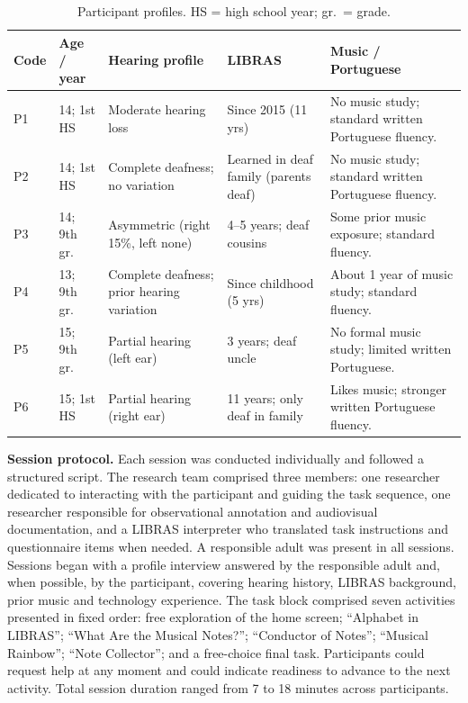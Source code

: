 \documentclass{llncs}
\begin{document}
\begin{table}[t]
  \caption{Participant profiles. HS = high school year; gr.\ = grade.}
  \label{tab:participants}
  \centering
  \footnotesize
  \setlength{\tabcolsep}{2.5pt}
  \renewcommand{\arraystretch}{1.12}
  \begin{tabular*}{\textwidth}{@{\extracolsep{\fill}}p{} p{} p{} p{} p{}@{}}
    \toprule
    \textbf{Code} & \textbf{Age / year} & \textbf{Hearing profile} &
      \textbf{LIBRAS} & \textbf{Music / Portuguese} \\
    \midrule
    P1 & 14; 1st HS & Moderate hearing loss &
      Since 2015 (11 yrs) &
      No music study; standard written Portuguese fluency. \\
    P2 & 14; 1st HS & Complete deafness; no variation &
      Learned in deaf family (parents deaf) &
      No music study; standard written Portuguese fluency. \\
    P3 & 14; 9th gr. & Asymmetric (right 15\%, left none) &
      4--5 years; deaf cousins &
      Some prior music exposure; standard fluency. \\
    P4 & 13; 9th gr. & Complete deafness; prior hearing variation &
      Since childhood (5 yrs) &
      About 1 year of music study; standard fluency. \\
    P5 & 15; 9th gr. & Partial hearing (left ear) &
      3 years; deaf uncle &
      No formal music study; limited written Portuguese. \\
    P6 & 15; 1st HS & Partial hearing (right ear) &
      11 years; only deaf in family &
      Likes music; stronger written Portuguese fluency. \\
    \bottomrule
  \end{tabular*}
\end{table}

\textbf{Session protocol.} Each session was conducted individually and followed a
structured script. The research team comprised three members: one researcher dedicated
to interacting with the participant and guiding the task sequence, one researcher
responsible for observational annotation and audiovisual documentation, and a LIBRAS
interpreter who translated task instructions and questionnaire items when needed. A
responsible adult was present in all sessions. Sessions began with a profile interview
answered by the responsible adult and, when possible, by the participant, covering
hearing history, LIBRAS background, prior music and technology experience. The task
block comprised seven activities presented in fixed order: free exploration of the home
screen; ``Alphabet in LIBRAS''; ``What Are the Musical Notes?''; ``Conductor of Notes'';
``Musical Rainbow''; ``Note Collector''; and a free-choice final task. Participants could
request help at any moment and could indicate readiness to advance to the next activity.
Total session duration ranged from 7 to 18 minutes across participants.
\end{document}
